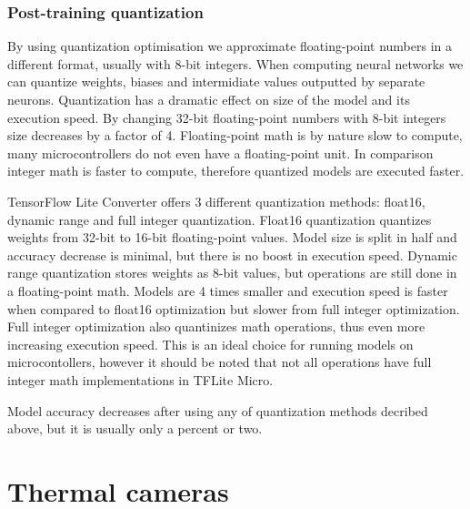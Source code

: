 \subsubsection{ Post-training quantization}

By using quantization optimisation we approximate floating-point numbers in a different format, usually with 8-bit integers.
When computing neural networks we can quantize weights, biases and intermidiate values outputted by separate neurons. 
Quantization has a dramatic effect on size of the model and its execution speed.
By changing 32-bit floating-point numbers with 8-bit integers size decreases by a factor of 4.
Floating-point math is by nature slow to compute, many microcontrollers do not even have a floating-point unit.
In comparison integer math is faster to compute, therefore quantized models are executed faster.

TensorFlow Lite Converter offers 3 different quantization methods: float16, dynamic range and full integer quantization\cite{quantization}.
Float16 quantization quantizes weights from 32-bit to 16-bit floating-point values. 
Model size is split in half and accuracy decrease is minimal, but there is no boost in execution speed.
Dynamic range quantization stores weights as 8-bit values, but operations are still done in a floating-point math.
Models are 4 times smaller and execution speed is faster when compared to float16 optimization but slower from full integer optimization.
Full integer optimization also quantinizes math operations, thus even more increasing execution speed.
This is an ideal choice for running models on microcontollers, however it should be noted that not all operations have full integer math implementations in TFLite Micro.

Model accuracy decreases after using any of quantization methods decribed above, but it is usually only a percent or two.
 


\section{ Thermal cameras}

